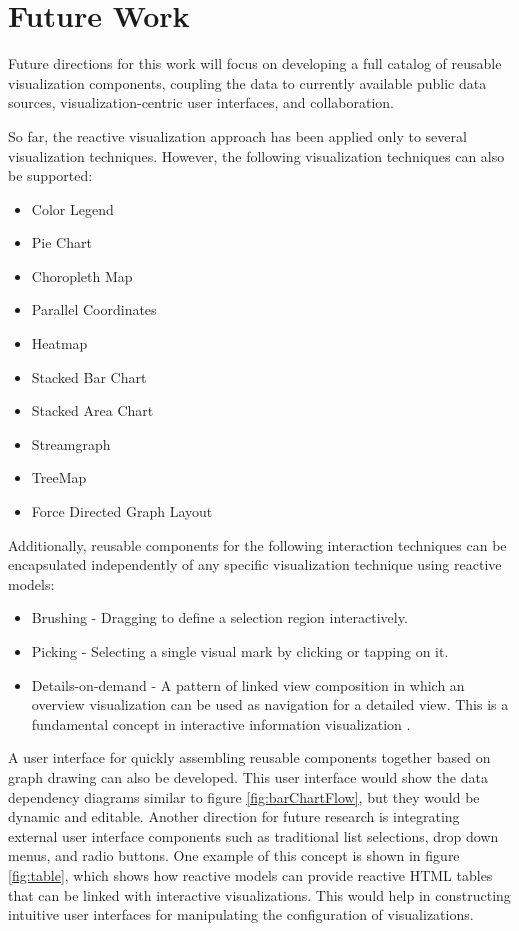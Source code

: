 \section{Future Work}
Future directions for this work will focus on developing a full catalog of reusable visualization components, coupling the data to currently available public data sources, visualization-centric user interfaces, and collaboration.

So far, the reactive visualization approach has been applied only to several visualization techniques. However, the following visualization techniques can also be supported:
\begin{itemize}
\item Color Legend
\item Pie Chart
\item Choropleth Map
\item Parallel Coordinates
\item Heatmap
\item Stacked Bar Chart
\item Stacked Area Chart
\item Streamgraph
\item TreeMap
\item Force Directed Graph Layout
\end{itemize}

Additionally, reusable components for the following interaction techniques can be encapsulated independently of any specific visualization technique using reactive models:
\begin{itemize}
\item Brushing - Dragging to define a selection region interactively.
\item Picking - Selecting a single visual mark by clicking or tapping on it.
\item Details-on-demand - A pattern of linked view composition in which an overview visualization can be used as navigation for a detailed view. This is a fundamental concept in interactive information visualization \cite{shneiderman1996eyes}.
\end{itemize}

A user interface for quickly assembling reusable components together based on graph drawing can also be developed. This user interface would show the data dependency diagrams similar to figure \ref{fig:barChartFlow}, but they would be dynamic and editable. Another direction for future research is integrating external user interface components such as traditional list selections, drop down menus, and radio buttons. One example of this concept is shown in figure \ref{fig:table}, which shows how reactive models can provide reactive HTML tables that can be linked with interactive visualizations. This would help in constructing intuitive user interfaces for manipulating the configuration of visualizations.

